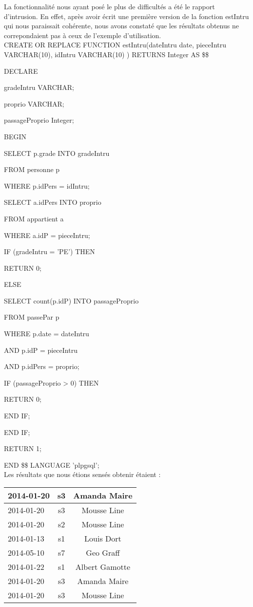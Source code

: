 La fonctionnalité nous ayant posé le plus de difficultés a été le rapport d'intrusion. En effet, après avoir écrit une première version de la fonction estIntru qui nous paraissait cohérente, nous avons constaté que les résultats obtenus ne correpondaient pas à ceux de l'exemple d'utilisation. \\

 

CREATE OR REPLACE FUNCTION estIntru(dateIntru date, pieceIntru VARCHAR(10), idIntru VARCHAR(10) ) RETURNS Integer AS \$\$

DECLARE

	gradeIntru VARCHAR;

	proprio VARCHAR;

	passageProprio Integer;

	

BEGIN

	SELECT p.grade INTO gradeIntru

	FROM personne p

	WHERE p.idPers = idIntru;



	SELECT a.idPers INTO proprio

	FROM appartient a

	WHERE a.idP = pieceIntru;



	IF (gradeIntru = 'PE') THEN

		RETURN 0;

	ELSE

		SELECT count(p.idP) INTO passageProprio

		FROM passePar p

		WHERE p.date = dateIntru

			AND p.idP = pieceIntru

			AND p.idPers = proprio;

		IF (passageProprio > 0) THEN

			RETURN 0;

		END IF;

	END IF;



	RETURN 1;



END \$\$ LANGUAGE 'plpgsql'; \\


Les résultats que nous étions sensés obtenir étaient :
\begin{center}
	\begin{tabular}
		{| l |	c |	c |} \hline
		2014-01-20 & s3 & Amanda Maire \\ \hline
		2014-01-20 & s3 & Mousse Line \\ \hline
		2014-01-20 & s2 & Mousse Line \\ \hline
		2014-01-13 & s1 & Louis Dort \\ \hline
		2014-05-10 & s7 & Geo Graff \\ \hline
		2014-01-22 & s1 & Albert Gamotte \\ \hline
		2014-01-20 & s3 & Amanda Maire \\ \hline
		2014-01-20 & s3 & Mousse Line \\ \hline
	\end{tabular}
\end{center}

